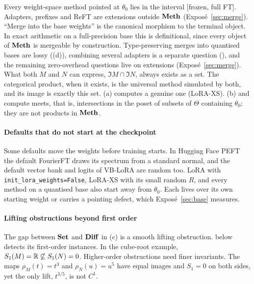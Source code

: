 \begin{explains}
Every weight-space method pointed at $\theta_0$ lies in the interval [frozen, full FT]. Adapters, prefixes and ReFT
\citep{wu2024reft} are extensions outside $\mathbf{Meth}$ (Exposé~\ref{sec:merge}). ``Merge into the base weights'' is the
canonical morphism to the terminal object. In exact arithmetic on a full-precision base this is definitional, since every
object of $\mathbf{Meth}$ is mergeable by construction. Type-preserving merges into quantised bases are lossy
((d)), combining several adapters is a separate question (), and the
remaining zero-overhead questions live on extensions (Exposé~\ref{sec:merge}). What both $M$ and $N$ can express,
$\Im M\cap\Im N$, always exists as a set. The categorical product, when it exists, is the universal method simulated by
both, and its image is exactly this set. (a) computes a genuine one (LoRA-XS).
(b) and  compute meets, that is, intersections in the poset of subsets of
$\Theta$ containing $\theta_0$; they are not products in $\mathbf{Meth}$.
\end{explains}

\paragraph{Defaults that do not start at the checkpoint}
Some defaults move the weights before training starts. In Hugging Face PEFT \citep{xmangrulkar2022peft} the default
FourierFT \citep{gao2024parameter} draws its spectrum from a standard normal, and the default vector bank and logits of
VB-LoRA \citep{li2024vb} are random too. LoRA with \texttt{init\_lora\_weights=False}, LoRA-XS with its small random $R$, and every method on
a quantised base also start away from $\theta_0$. Each lives over its own starting weight or carries a pointing defect,
which Exposé~\ref{sec:base} measures.

\paragraph{Lifting obstructions beyond first order}
The gap between $\mathbf{Set}$ and $\mathbf{Diff}$ in (c) is a smooth lifting obstruction.  below detects its
first-order instances. In the cube-root example, $S_1(M)=\mathbb{R}\not\subseteq S_1(N)=0$. Higher-order obstructions need finer
invariants. The maps $\rho_M(t)=t^3$ and $\rho_N(u)=u^5$ have equal images and $S_1=0$ on both sides, yet the only lift,
$t^{3/5}$, is not $C^1$.

